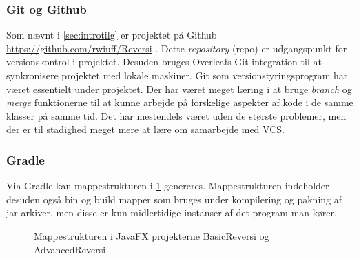\subsubsection{Git og Github}
Som nævnt i \cref{sec:introtilg} er projektet på Github \href{https://github.com/rwiuff/Reversi}{https://github.com/rwiuff/Reversi} . Dette \emph{repository} (repo) er udgangspunkt for versionskontrol i projektet. Desuden bruges Overleafs Git integration til at synkronisere projektet med lokale maskiner. Git som versionstyringsprogram har været essentielt under projektet. Der har været meget læring i at bruge \emph{branch} og \emph{merge} funktionerne til at kunne arbejde på forskelige aspekter af kode i de samme klasser på samme tid. Det har mestendels været uden de største problemer, men der er til stadighed meget mere at lære om samarbejde med VCS.
\subsubsection{Gradle}
Via Gradle kan mappestrukturen i \cref{fig:tree} genereres. Mappestrukturen indeholder desuden også bin og build mapper som bruges under kompilering og pakning af jar-arkiver, men disse er kun midlertidige instanser af det program man kører.
\begin{figure}[H]
    \caption{Mappestrukturen i JavaFX projekterne BasicReversi og AdvancedReversi}\label{fig:tree}
\end{figure}


